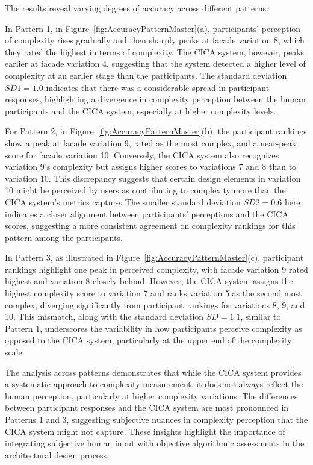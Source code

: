 The results reveal varying degrees of accuracy across different patterns:

In Pattern 1, in Figure~\ref{fig:AccuracyPatternMaster}(a), participants' perception of complexity rises gradually and then sharply peaks at facade variation 8, which they rated the highest in terms of complexity.
The CICA system, however, peaks earlier at facade variation 4, suggesting that the system detected a higher level of complexity at an earlier stage than the participants.
The standard deviation \(SD1 = 1.0\) indicates that there was a considerable spread in participant responses, highlighting a divergence in complexity perception between the human participants and the CICA system, especially at higher complexity levels.

For Pattern 2, in Figure~\ref{fig:AccuracyPatternMaster}(b), the participant rankings show a peak at facade variation 9, rated as the most complex, and a near-peak score for facade variation 10.
Conversely, the CICA system also recognizes variation 9's complexity but assigns higher scores to variations 7 and 8 than to variation 10.
This discrepancy suggests that certain design elements in variation 10 might be perceived by users as contributing to complexity more than the CICA system's metrics capture.
The smaller standard deviation \(SD2 = 0.6\) here indicates a closer alignment between participants’ perceptions and the CICA scores, suggesting a more consistent agreement on complexity rankings for this pattern among the participants.

In Pattern 3, as illustrated in Figure~\ref{fig:AccuracyPatternMaster}(c), participant rankings highlight one peak in perceived complexity, with facade variation 9 rated highest and variation 8 closely behind.
However, the CICA system assigns the highest complexity score to variation 7 and ranks variation 5 as the second most complex, diverging significantly from participant rankings for variations 8, 9, and 10.
This mismatch, along with the standard deviation \(SD = 1.1\), similar to Pattern 1, underscores the variability in how participants perceive complexity as opposed to the CICA system, particularly at the upper end of the complexity scale.

The analysis across patterns demonstrates that while the CICA system provides a systematic approach to complexity measurement, it does not always reflect the human perception, particularly at higher complexity variations.
The differences between participant responses and the CICA system are most pronounced in Patterns 1 and 3, suggesting subjective nuances in complexity perception that the CICA system might not capture.
These insights highlight the importance of integrating subjective human input with objective algorithmic assessments in the architectural design process.


